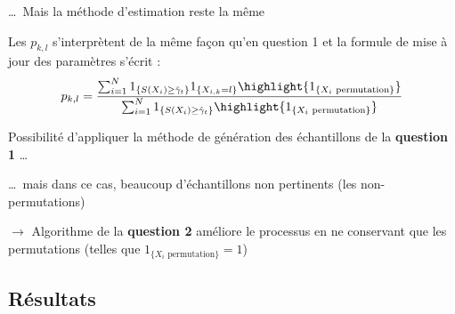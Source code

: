\documentclass[10pt,xcolor=table,color={dvipsnames,usenames},ignorenonframetext,usepdftitle=false,french]{beamer}
\begin{document}
\begin{frame}{\dots ~Mais la méthode d'estimation reste la même}
\protect\hypertarget{mais-la-muxe9thode-destimation-reste-la-muxeame}{}

Les \(p_{k,l}\) s'interprètent de la même façon qu'en question 1 et la
formule de mise à jour des paramètres s'écrit : \[p_{k,l}=\frac{
\sum_{i=1}^{N}1_{\{S(X_{i})\geq\hat{\gamma}_{t}\}}1_{\left\{ X_{i,k}=l\right\} }
\highlight{1_{\{X_{i}\text{ permutation}\}}}
}{
\sum_{i=1}^{N}1_{\{S(X_{i})\geq\hat{\gamma}_{t}\}}
\highlight{1_{\{X_{i}\text{ permutation}\}}}
}\]

\pause

Possibilité d'appliquer la méthode de génération des échantillons de la
\textbf{question 1} \dots

\pause

\dots ~mais dans ce cas, beaucoup d'échantillons non pertinents (les
non-permutations)

\pause

\(\longrightarrow\) Algorithme de la \textbf{question 2} améliore le
processus en ne conservant que les permutations (telles que
\(1_{\{X_{i}\text{ permutation}\}} = 1\))

\end{frame}

\hypertarget{ruxe9sultats-1}{%
\subsection{Résultats}\label{ruxe9sultats-1}}
\end{document}
